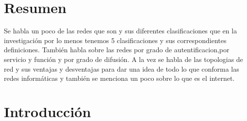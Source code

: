 \documentclass{bmcart}
\begin{document}


\section*{Resumen}
Se habla un poco de las redes que son y sus diferentes clasificaciones que en la investigación por lo menos tenemos 5 clasificaciones y sus correspondientes definiciones.
También habla sobre las redes por grado de autentificacion,por servicio y función y por grado de difusión.
A la vez se habla de las topologias de red y sus ventajas y desventajas para dar una idea de todo lo que conforma las redes informáticas y también se menciona un poco sobre lo que es el internet.   
\section*{Introducción}
\end{document}
